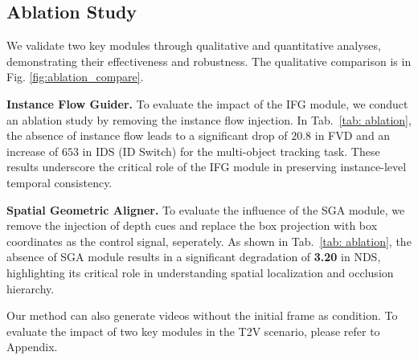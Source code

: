 \subsection{Ablation Study}
We validate two key modules through qualitative and quantitative analyses, demonstrating their effectiveness and robustness.
The qualitative comparison is in Fig. \ref{fig:ablation_compare}. 


\noindent \textbf{Instance Flow Guider.}
To evaluate the impact of the IFG module, we conduct an ablation study by removing the instance flow injection. 
In Tab.~\ref{tab: ablation}, the absence of instance flow leads to a significant drop of $20.8$ in FVD and an increase of $653$ in IDS (ID Switch) for the multi-object tracking task.
These results underscore the critical role of the IFG module in preserving instance-level temporal consistency.

\noindent \textbf{Spatial Geometric Aligner.}
To evaluate the influence of the SGA module, we remove the injection of depth cues and replace the box projection with box coordinates as the control signal, seperately. 
As shown in Tab.~\ref{tab: ablation}, the absence of SGA module results in a significant degradation of \textbf{3.20} in NDS, highlighting its critical role in understanding spatial localization and occlusion hierarchy.



\noindent Our method can also generate videos without the initial frame as condition. To evaluate the impact of two key modules in the T2V scenario, please refer to Appendix.
